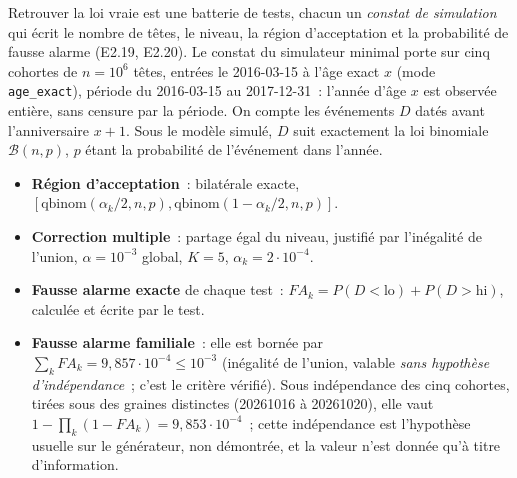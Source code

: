 \documentclass[a4paper,11pt]{article}
\newcommand{\code}[1]{\texttt{\small #1}}
\begin{document}
Retrouver la loi vraie est une batterie de tests, chacun un \emph{constat de
simulation} qui écrit le nombre de têtes, le niveau, la région d'acceptation et
la probabilité de fausse alarme (E2.19, E2.20). Le constat du simulateur
minimal porte sur cinq cohortes de $n = 10^{6}$ têtes, entrées le
2016-03-15 à l'âge exact $x$ (mode \code{age\_exact}), période du 2016-03-15
au 2017-12-31~: l'année d'âge $x$ est observée entière, sans censure par la
période. On compte les événements $D$ datés avant l'anniversaire $x+1$. Sous
le modèle simulé, $D$ suit exactement la loi binomiale
$\mathcal{B}(n, p)$, $p$ étant la probabilité de l'événement dans l'année.

\begin{itemize}[leftmargin=*, itemsep=2pt]
  \item \textbf{Région d'acceptation}~: bilatérale exacte,
    $[\text{qbinom}(\alpha_k/2, n, p), \text{qbinom}(1 - \alpha_k/2, n, p)]$.
  \item \textbf{Correction multiple}~: partage égal du niveau, justifié par
    l'inégalité de l'union, $\alpha = 10^{-3}$ global, $K = 5$, $\alpha_k =
    2\cdot 10^{-4}$.
  \item \textbf{Fausse alarme exacte} de chaque test~:
    $FA_k = P(D < \text{lo}) + P(D > \text{hi})$, calculée et écrite par le
    test.
  \item \textbf{Fausse alarme familiale}~: elle est bornée par
    $\sum_k FA_k = 9{,}857\cdot 10^{-4} \le 10^{-3}$ (inégalité de l'union,
    valable \emph{sans hypothèse d'indépendance}~; c'est le critère vérifié).
    Sous indépendance des cinq cohortes, tirées sous des graines distinctes
    (20261016 à 20261020), elle vaut $1 - \prod_k (1 - FA_k) = 9{,}853\cdot
    10^{-4}$~; cette indépendance est l'hypothèse usuelle sur le générateur,
    non démontrée, et la valeur n'est donnée qu'à titre d'information.
\end{itemize}
\end{document}
